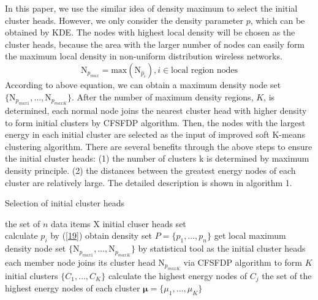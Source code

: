 \documentclass[journal,twoside,web]{ieeecolor}
\begin{document}
In this paper, we use the similar idea of density maximum to select the initial cluster heads. However, we only consider the density parameter $p$, which can be obtained by KDE. The nodes with highest local density will be chosen as the cluster heads, because the area with the larger number of nodes can easily form the maximum local density in non-uniform distribution wireless networks.
\begin{equation}
\text{N}_{p_{max}} = \text{max}\left(\text{N}_{\hat{p}_i}\right), i \in \text{local region nodes}
\end{equation}
According to above equation, we can obtain a maximum density node set $\{\text{N}_{p_{max1}},\dots,\text{N}_{p_{maxK}}\}$. After the number of maximum density regions, $K$, is determined, each normal node joins the nearest cluster head with higher density to form initial clusters by CFSFDP algorithm. Then, the nodes with the largest energy in each initial cluster are selected as the input of improved soft K-means clustering algorithm. There are several benefits through the above steps to ensure the initial cluster heads: (1) the number of clusters k is determined by maximum density principle. (2) the distances between the greatest energy nodes of each cluster are relatively large. The detailed description is shown in algorithm 1. 

\begin{algorithm}
	\caption{Selection of initial cluster heads}
	\label{alg1} 
	\begin{algorithmic}[1]
		\renewcommand{\algorithmicrequire}{\textbf{Input:}}
		\renewcommand{\algorithmicensure}{\textbf{Output:}}
		\REQUIRE the set of $n$ data items X
		\ENSURE  initial cluser heads set \\
		\STATE calculate $p_i$ by (\ref{19})
		\ENDFOR
		\STATE obtain density set $P = \{p_1,\dots,p_n\}$
		\STATE get local maximum density node set $\{\text{N}_{p_{max1}},\dots,\text{N}_{p_{maxK}}\}$ by statistical tool as the initial cluster heads
		\STATE 	each member node joins its cluster head $\text{N}_{p_{maxK}}$ via CFSFDP algorithm to form $K$ initial clusters $\{C_1,\dots, C_K\}$
		\STATE calculate the highest energy nodes of $C_j$
		\ENDFOR
		\RETURN the set of the highest energy nodes of each cluster $\bm{\mu} = \{\mu_1,\dots,\mu_K\}$
	\end{algorithmic}
\end{algorithm}
\end{document}

